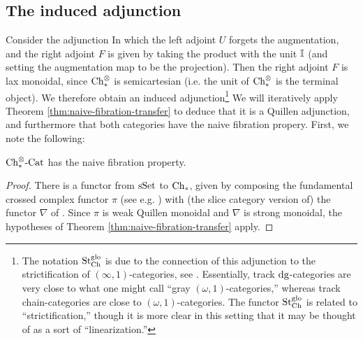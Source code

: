\documentclass[12pt]{amsart}
\begin{document}
\subsection{The induced adjunction}
Consider the adjunction 
In which the left adjoint $U$ forgets the augmentation, and the right adjoint $F$ is given by 
taking the product with the unit $\mathbb{I}$ (and setting the augmentation map to be the projection). 
Then the right adjoint $F$ is lax monoidal, since $\mathrm{Ch}_{*}^\otimes$ is semicartesian (i.e. the unit of $\mathrm{Ch}_{*}^\otimes$ is the terminal object). 
We therefore obtain an induced adjunction\footnote{
	The notation ${\mathrm{St}^{\mathrm{glo}}_\mathrm{Ch}}$ is due to the connection of this adjunction to the strictification of $(\infty,1)$-categories, see \cite{Strong2025}.
	Essentially, track $\mathrm{dg}$-categories are very close to what one might call ``gray $(\omega,1)$-categories,'' whereas track chain-categories are close to $(\omega,1)$-categories. 
	The functor ${\mathrm{St}^{\mathrm{glo}}_\mathrm{Ch}}$ is related to ``strictification,'' though it is more clear in this setting that it may be thought of as a sort of ``linearization.''
}
\adjunctiondiagram{\dgbarconstruction}{\trackdgcataug}{\trackchaincat}{\dgbaradjoint}
We will iteratively apply Theorem \ref{thm:naive-fibration-transfer} to deduce that it is a Quillen adjunction, and furthermore that both categories have the naive fibration propery. First, we note the following:

\begin{theorem}\label{thm:track-dg-cat-naive-fibration}
	${\mathrm{Ch}_{*}^{\otimes}\text{-}\mathrm{Cat}}$ has the naive fibration property.
\end{theorem}
\begin{proof}
	There is a functor from $\mathrm{sSet}$ to $\mathrm{Ch}_{*}$, given by composing the fundamental crossed complex functor $\pi$ (see e.g. \cite{Tonks_2003}) with (the slice category version of) the functor $\nabla$ of \cite[Section 7.4]{Brown_Higgins_Sivera_2011}. Since $\pi$ is weak Quillen monoidal and $\nabla$ is strong monoidal, the hypotheses of Theorem \ref{thm:naive-fibration-transfer} apply.
\end{proof}
	
\end{document}
